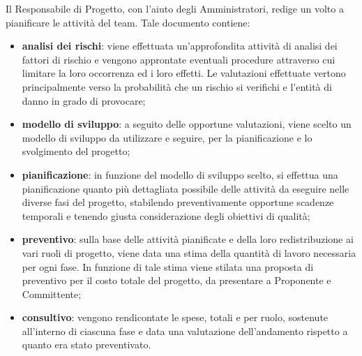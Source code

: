     Il Responsabile di Progetto, con l'aiuto degli Amministratori, redige un \PdP{} volto a pianificare le attività del team. Tale documento contiene:
    \begin{itemize}
       		\item{\textbf{analisi dei rischi}: viene effettuata un'approfondita attività di analisi dei fattori di rischio e vengono approntate eventuali procedure attraverso cui limitare la loro occorrenza ed i loro effetti.
       		Le valutazioni effettuate vertono principalmente verso la probabilità che un rischio si verifichi e l'entità di danno in grado di provocare;}
       		\item{\textbf{modello di sviluppo}: a seguito delle opportune valutazioni, viene scelto un modello di sviluppo da utilizzare e seguire, per la pianificazione e lo svolgimento del progetto;}
       		\item{\textbf{pianificazione}: in funzione del modello di sviluppo scelto, si effettua una pianificazione quanto più dettagliata possibile delle attività da eseguire nelle diverse fasi del progetto, stabilendo preventivamente opportune scadenze temporali e tenendo giusta considerazione degli obiettivi di qualità;}
       		\item{\textbf{preventivo}: sulla base delle attività pianificate e della loro redistribuzione ai vari ruoli di progetto, viene data una stima della quantità di lavoro necessaria per ogni fase. In funzione di tale stima viene stilata una proposta di preventivo per il costo totale del progetto, da presentare a Proponente e Committente;}
       		\item{\textbf{consultivo}: vengono rendicontate le spese, totali e per ruolo, sostenute all'interno di ciascuna fase e data una valutazione dell'andamento rispetto a quanto era stato preventivato.}
    \end{itemize}
    
